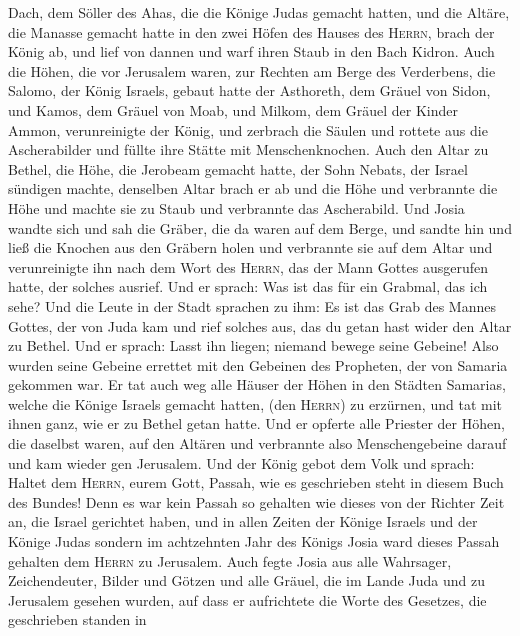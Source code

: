 Dach, dem Söller des Ahas, die die Könige Judas gemacht hatten, und die
Altäre, die Manasse gemacht hatte in den zwei Höfen des Hauses des
\textsc{Herrn}, brach der König ab, und lief von dannen und warf ihren
Staub in den Bach Kidron.  Auch die Höhen, die vor
Jerusalem waren, zur Rechten am Berge des Verderbens, die Salomo, der
König Israels, gebaut hatte der Asthoreth, dem Gräuel von Sidon, und
Kamos, dem Gräuel von Moab, und Milkom, dem Gräuel der Kinder Ammon,
verunreinigte der König,  und zerbrach die Säulen und
rottete aus die Ascherabilder und füllte ihre Stätte mit
Menschenknochen.  Auch den Altar zu Bethel, die Höhe, die
Jerobeam gemacht hatte, der Sohn Nebats, der Israel sündigen machte,
denselben Altar brach er ab und die Höhe und verbrannte die Höhe und
machte sie zu Staub und verbrannte das Ascherabild.  Und
Josia wandte sich und sah die Gräber, die da waren auf dem Berge, und
sandte hin und ließ die Knochen aus den Gräbern holen und verbrannte sie
auf dem Altar und verunreinigte ihn nach dem Wort des \textsc{Herrn},
das der Mann Gottes ausgerufen hatte, der solches ausrief.
 Und er sprach: Was ist das für ein Grabmal, das ich
sehe? Und die Leute in der Stadt sprachen zu ihm: Es ist das Grab des
Mannes Gottes, der von Juda kam und rief solches aus, das du getan hast
wider den Altar zu Bethel.  Und er sprach: Lasst ihn
liegen; niemand bewege seine Gebeine! Also wurden seine Gebeine errettet
mit den Gebeinen des Propheten, der von Samaria gekommen war.
 Er tat auch weg alle Häuser der Höhen in den Städten
Samarias, welche die Könige Israels gemacht hatten, (den \textsc{Herrn})
zu erzürnen, und tat mit ihnen ganz, wie er zu Bethel getan hatte.
 Und er opferte alle Priester der Höhen, die daselbst
waren, auf den Altären und verbrannte also Menschengebeine darauf und
kam wieder gen Jerusalem.  Und der König gebot dem Volk
und sprach: Haltet dem \textsc{Herrn}, eurem Gott, Passah, wie es
geschrieben steht in diesem Buch des Bundes!  Denn es war
kein Passah so gehalten wie dieses von der Richter Zeit an, die Israel
gerichtet haben, und in allen Zeiten der Könige Israels und der Könige
Judas  sondern im achtzehnten Jahr des Königs Josia ward
dieses Passah gehalten dem \textsc{Herrn} zu Jerusalem. 
Auch fegte Josia aus alle Wahrsager, Zeichendeuter, Bilder und Götzen
und alle Gräuel, die im Lande Juda und zu Jerusalem gesehen wurden, auf
dass er aufrichtete die Worte des Gesetzes, die geschrieben standen in
